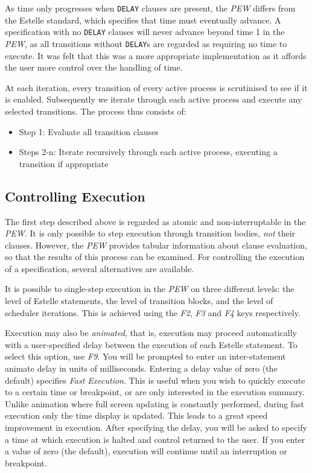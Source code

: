 As time only progresses when {\tt DELAY} clauses are present, the
{\em PEW} differs from the Estelle standard, which specifies that
time must eventually advance. A specification with no {\tt DELAY} clauses will never
advance beyond time 1 in the {\em PEW}, as all transitions without
{\tt DELAY}s are
regarded as requiring no time to execute. It was felt that this was a
more appropriate implementation as it affords the user more control
over the handling of time. 

At each iteration, every  transition of every active process is
scrutinised to see if  it is  enabled. Subsequently  we iterate
through  each  active  process and execute   any   selected
transitions. The process thus consists of:

\begin {itemize}
\item Step 1:    Evaluate all transition clauses
\item Steps 2-n: Iterate recursively through each active process, executing a transition if
appropriate
\end{itemize}

\subsection[Controlling Execution]{Controlling Execution}

The first step described above is regarded as atomic and non-interruptable in the
{\em PEW}. It is only possible to step execution through transition
bodies, {\em not} their clauses. However, the {\em PEW} provides
tabular information about clause evaluation, so
that the results of this process can be examined. For controlling the
execution of a specification, several alternatives are available.

It is possible to single-step execution in the {\em PEW} on three
different levels: the level of Estelle statements, the level of
transition blocks, and the level of scheduler iterations. This is
achieved using the {\em F2}, {\em F3} and {\em F4} keys respectively.

Execution may also be {\em animated}, that is, execution may
proceed automatically with a user-specified delay between the
execution of each Estelle statement. To select this option, use {\em
F9}. You will be prompted to enter an inter-statement animate delay
in units of milliseconds. Entering a delay value of zero (the
default) specifies {\em Fast Execution}. This
is useful when you wish to quickly execute to a certain time or
breakpoint, or are only interested in the execution summary. Unlike
animation where full screen updating is constantly  performed,
during fast execution only the time display is updated. This leads to a great
speed improvement in execution.
After specifying the delay, you will
be asked to specify a time at which execution is halted and
control returned to the user. If you enter a value of zero (the
default), execution will continue until an interruption or
breakpoint.

